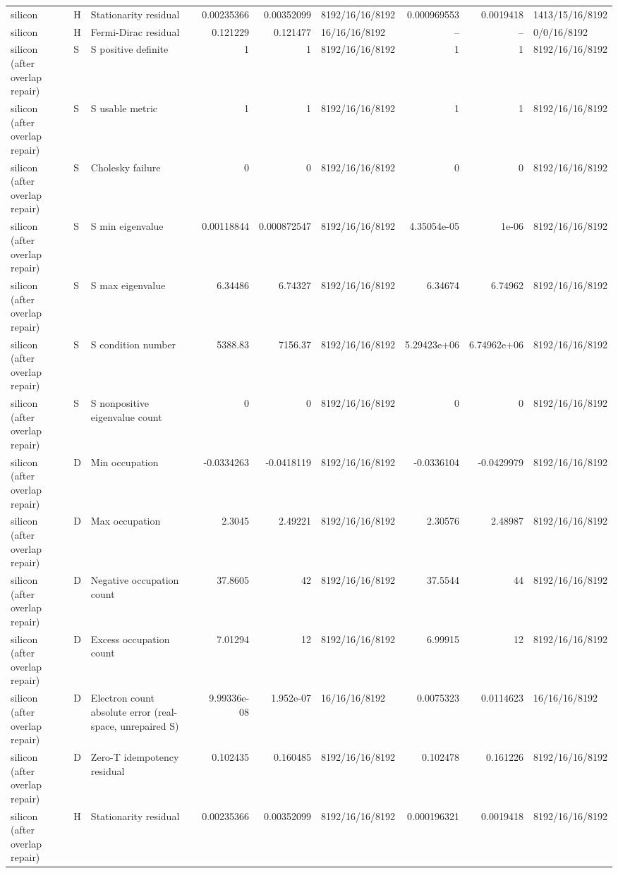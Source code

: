 \begin{tabular}{lllrrlrrl}
silicon & H & Stationarity residual & 0.00235366 & 0.00352099 & 8192/16/16/8192 & 0.000969553 & 0.0019418 & 1413/15/16/8192 \\
silicon & H & Fermi-Dirac residual & 0.121229 & 0.121477 & 16/16/16/8192 & -- & -- & 0/0/16/8192 \\
silicon (after overlap repair) & S & S positive definite & 1 & 1 & 8192/16/16/8192 & 1 & 1 & 8192/16/16/8192 \\
silicon (after overlap repair) & S & S usable metric & 1 & 1 & 8192/16/16/8192 & 1 & 1 & 8192/16/16/8192 \\
silicon (after overlap repair) & S & Cholesky failure & 0 & 0 & 8192/16/16/8192 & 0 & 0 & 8192/16/16/8192 \\
silicon (after overlap repair) & S & S min eigenvalue & 0.00118844 & 0.000872547 & 8192/16/16/8192 & 4.35054e-05 & 1e-06 & 8192/16/16/8192 \\
silicon (after overlap repair) & S & S max eigenvalue & 6.34486 & 6.74327 & 8192/16/16/8192 & 6.34674 & 6.74962 & 8192/16/16/8192 \\
silicon (after overlap repair) & S & S condition number & 5388.83 & 7156.37 & 8192/16/16/8192 & 5.29423e+06 & 6.74962e+06 & 8192/16/16/8192 \\
silicon (after overlap repair) & S & S nonpositive eigenvalue count & 0 & 0 & 8192/16/16/8192 & 0 & 0 & 8192/16/16/8192 \\
silicon (after overlap repair) & D & Min occupation & -0.0334263 & -0.0418119 & 8192/16/16/8192 & -0.0336104 & -0.0429979 & 8192/16/16/8192 \\
silicon (after overlap repair) & D & Max occupation & 2.3045 & 2.49221 & 8192/16/16/8192 & 2.30576 & 2.48987 & 8192/16/16/8192 \\
silicon (after overlap repair) & D & Negative occupation count & 37.8605 & 42 & 8192/16/16/8192 & 37.5544 & 44 & 8192/16/16/8192 \\
silicon (after overlap repair) & D & Excess occupation count & 7.01294 & 12 & 8192/16/16/8192 & 6.99915 & 12 & 8192/16/16/8192 \\
silicon (after overlap repair) & D & Electron count absolute error (real-space, unrepaired S) & 9.99336e-08 & 1.952e-07 & 16/16/16/8192 & 0.0075323 & 0.0114623 & 16/16/16/8192 \\
silicon (after overlap repair) & D & Zero-T idempotency residual & 0.102435 & 0.160485 & 8192/16/16/8192 & 0.102478 & 0.161226 & 8192/16/16/8192 \\
silicon (after overlap repair) & H & Stationarity residual & 0.00235366 & 0.00352099 & 8192/16/16/8192 & 0.000196321 & 0.0019418 & 8192/16/16/8192 \\

\end{tabular}
